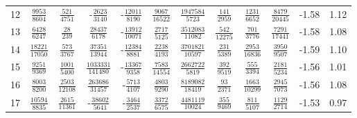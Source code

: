 \begin{sidewaystable}
\begin{tabular}{r|ccccccccc|c@{ -- }c@{\%}}
12
&  $\frac{            9953}{            8604}$
&  $\frac{             521}{            4751}$
& -$\frac{            2623}{            3140}$
& -$\frac{           12011}{            8190}$
&  $\frac{            9067}{           16522}$
&  $\frac{         1947584}{            5723}$
&  $\frac{             141}{            2959}$
&  $\frac{            1231}{            6652}$
&  $\frac{            8479}{           20445}$
&  -1.58 &  1.12
\\
13
&  $\frac{            6428}{            6247}$
&  $\frac{              28}{             239}$
&  $\frac{           28437}{            6178}$
& -$\frac{           13912}{           10071}$
&  $\frac{            2717}{            5125}$
&  $\frac{         3512083}{           11082}$
&  $\frac{             542}{           12275}$
&  $\frac{             701}{            3776}$
&  $\frac{            7291}{           17441}$
&  -1.58 &  1.08
\\
14
&  $\frac{           18221}{           17050}$
&  $\frac{             573}{            3767}$
&  $\frac{           37351}{           13944}$
& -$\frac{           12384}{            8881}$
&  $\frac{            2238}{            4193}$
&  $\frac{         3701821}{           10597}$
&  $\frac{             231}{            5389}$
&  $\frac{            2953}{           16836}$
&  $\frac{            3950}{            9507}$
&  -1.59 &  1.10
\\
15
&  $\frac{            9251}{            9369}$
&  $\frac{            1001}{            5400}$
&  $\frac{         1033331}{          141480}$
& -$\frac{           13367}{            9358}$
&  $\frac{            7583}{           14554}$
&  $\frac{         2662722}{            5819}$
&  $\frac{             392}{            9519}$
&  $\frac{             555}{            3394}$
&  $\frac{            2181}{            5234}$
&  -1.56 &  1.01
\\
16
&  $\frac{            8003}{            8200}$
&  $\frac{            2503}{           12108}$
&  $\frac{          263686}{           31457}$
& -$\frac{            5713}{            4107}$
&  $\frac{            4803}{            9290}$
&  $\frac{         8189082}{           18419}$
&  $\frac{              93}{            2371}$
&  $\frac{            1663}{           10299}$
&  $\frac{            2945}{            7073}$
&  -1.56 &  1.08
\\
17
&  $\frac{           10594}{            8835}$
&  $\frac{            2615}{           11361}$
& -$\frac{           38602}{            5641}$
& -$\frac{            3464}{            2537}$
&  $\frac{            3372}{            6575}$
&  $\frac{         4481119}{           10024}$
&  $\frac{             355}{            9469}$
&  $\frac{             811}{            5107}$
&  $\frac{            1129}{            2714}$
&  -1.53 &  0.97
\end{tabular}
\end{sidewaystable}

